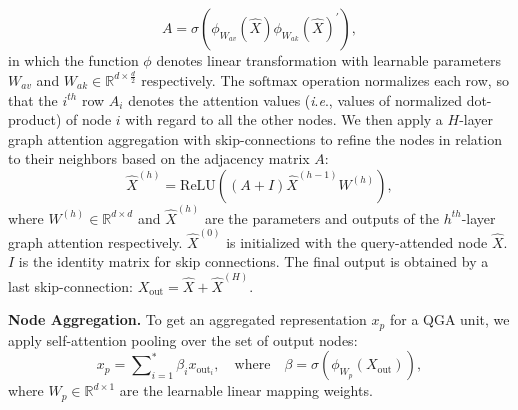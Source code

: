 \documentclass[letterpaper]{article} \usepackage{aaai21}  \usepackage{times}  \usepackage{helvet} \usepackage{courier}  \usepackage[hyphens]{url}  \usepackage{graphicx} \urlstyle{rm} \def\UrlFont{\rm}  \usepackage{natbib}  \usepackage{caption} \usepackage{color, colortbl}
\newcommand{\ie}{\textit{i}.\textit{e}.}
\begin{document}
\begin{equation}
    A= \sigma(\phi_{W_{av}}(\hat{X})\phi_{W_{ak}}(\hat{X})^\mathrm{'}), 
\end{equation}
in which the function $\phi$ denotes linear transformation with learnable parameters $W_{av}$ and $W_{ak} \in \mathbb{R}^{d \times \frac{d}{2}}$ respectively. The $\text{softmax}$ operation normalizes each row, so that the $i^{th}$ row $A_i$ denotes the attention values (\ie, values of normalized dot-product) of node $i$ with regard to all the other nodes. We then apply a $H$-layer graph attention aggregation with skip-connections to refine the nodes in relation to their neighbors based on the adjacency matrix $A$: 
\begin{equation}
    \hat{X}^{(h)} = \mathrm{ReLU}((A+I)\hat{X}^{(h-1)}W^{(h)}), 
\end{equation}
where $W^{(h)} \in \mathbb{R}^{d\times d}$ and $\hat{X}^{(h)}$ are the parameters and outputs of the $h^{th}$-layer graph attention respectively. $\hat{X}^{(0)}$ is initialized with the query-attended node $\hat{X}$. $I$ is the identity matrix for skip connections. The final output is obtained by a last skip-connection: $X_{\text{out}} = \hat{X} + \hat{X}^{(H)}$.

\textbf{Node Aggregation.} To get an aggregated representation $x_p$ for a QGA unit, we apply self-attention pooling \cite{lee2019self} over the set of output nodes:
\begin{equation}
   x_p = \sum\nolimits_{i=1}^* \beta_i x_{\text{out}_i}, \quad \text{where} \quad \beta = \sigma(\phi_{W_p}(X_{\text{out}})),
\end{equation}
where $W_p \in \mathbb{R}^{d \times 1}$ are the learnable linear mapping weights. 
\end{document}
